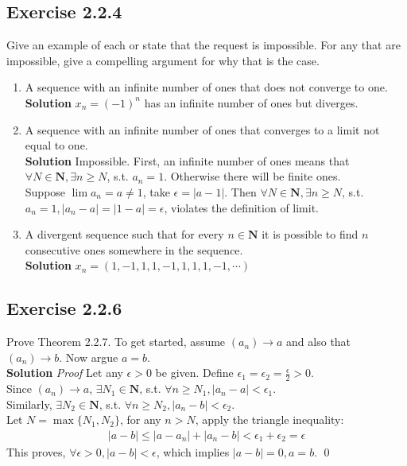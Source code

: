 \documentclass[12pt]{report}
\begin{document}
\subsection*{Exercise 2.2.4}
Give an example of each or state that the request is impossible. For any that are impossible, give a compelling argument for why that is the case.
\begin{enumerate}[label=(\alph*)]
    \item A sequence with an infinite number of ones that does not converge to one.\\
    \textbf{Solution} $x_n = (-1)^n$ has an infinite number of ones but diverges.
    \item A sequence with an infinite number of ones that converges to a limit not equal to one.\\
    \textbf{Solution} Impossible. First, an infinite number of ones means that $\forall N \in \mathbf{N}, \exists n \geq N$, s.t. $a_n = 1$. Otherwise there will be finite ones.\\
    Suppose $\lim a_n = a \neq 1$, take $\epsilon = |a-1|$. Then $\forall N \in \mathbf{N}, \exists n \geq N$, s.t. $a_n = 1, |a_n-a|=|1-a|=\epsilon$, violates the definition of limit.
    \item A divergent sequence such that for every $n \in \mathbf{N}$ it is possible to find $n$ consecutive ones somewhere in the sequence.\\
    \textbf{Solution} $x_n = (1,-1,1,1,-1,1,1,1,-1,\cdots)$
\end{enumerate}

\subsection*{Exercise 2.2.6}
Prove Theorem 2.2.7. To get started, assume $\left(a_n\right) \rightarrow a$ and also that $\left(a_n\right) \rightarrow b$. Now argue $a=b$.\\
\textbf{Solution} \textit{Proof} Let any $\epsilon > 0 $ be given. Define $\epsilon_1 = \epsilon_2 = \frac{\epsilon}{2} >0$.\\
Since $(a_n) \to a$, $\exists N_1 \in \mathbf{N}$, s.t. $\forall n \geq N_1, |a_n-a|<\epsilon_1$.\\
Similarly, $\exists N_2 \in \mathbf{N}$, s.t. $\forall n \geq N_2, |a_n-b|<\epsilon_2$.\\
Let $N = \max\{N_1,N_2\}$, for any $n>N$, apply the triangle inequality:
\begin{align*}
    |a-b| \leq |a-a_n|+|a_n-b| < \epsilon_1+\epsilon_2 = \epsilon
\end{align*}
This proves, $\forall \epsilon >0 , |a-b| < \epsilon$, which implies $|a-b|=0, a=b$. \qed
\end{document}
